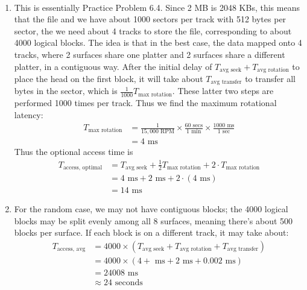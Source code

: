 \documentclass[12pt]{article}
\newenvironment{sol}[1][Solution]{\begin{trivlist}
		\item[\hskip \labelsep {\bfseries #1:}]}{\end{trivlist}}
\begin{document}
\begin{sol}
	\
	\begin{enumerate}[label=(\alph*)]
		\item This is essentially Practice Problem 6.4. Since 2 MB is 2048 KBs, this means that the file
		and we have about 1000 sectors per track with 512 bytes per sector, the we need about 4 tracks
		to store the file, corresponding to about 4000 logical blocks.  The idea is that in the best case, the
		data mapped onto 4 tracks, where 2 surfaces share one platter and 2 surfaces share a different platter,
		in a contiguous way. After the initial delay of $T_{\text{avg seek}}+T_{\text{avg rotation}}$ to place
		the head on the first block, it will take about $T_{\text{avg transfer}}$ to transfer
		all bytes in the sector, which is $\frac{1}{1000}T_{\text{max rotation}}$. These latter
		two steps are performed 1000 times per track. Thus we find the maximum rotational latency:
		\begin{align*}
			T_{\text{max rotation}}&=\frac{1}{15,000\text{ RPM}}
			\times \frac{60\text{ secs}}{1\text{ min}}
			\times \frac{1000 \text{ ms}}{1\text{ sec}}\\
			&=4\text{ ms}
		\end{align*}
		Thus the optional access time is
		\begin{align*}
			T_{\text{access, optimal}}&=T_{\text{avg seek}}+\frac{1}{2}T_{\text{max rotation}}
			+2\cdot T_{\text{max rotation}}\\
			&=4\text{ ms} + 2\text{ ms} + 2\cdot (4\text{ ms})\\
			&=14\text{ ms}
		\end{align*}
		\item For the random case, we may not have contiguous blocks; the 4000 logical blocks may be split
		evenly among all 8 surfaces, meaning there's about 500 blocks per surface. If each block is on
		a different track, it may take about:
		\begin{align*}
			T_{\text{access, avg}}&=
			4000\times \left( T_{\text{avg seek}} + T_{\text{avg rotation}} + T_{\text{avg
					transfer}}\right)\\
			&=4000\times (4 + \text{ ms} + 2 \text{ ms} + 0.002\text{ ms})\\
			&=24008\text{ ms}\\
			&\approx 24 \text{ seconds}
		\end{align*}
	\end{enumerate}
\end{sol}
\end{document}
